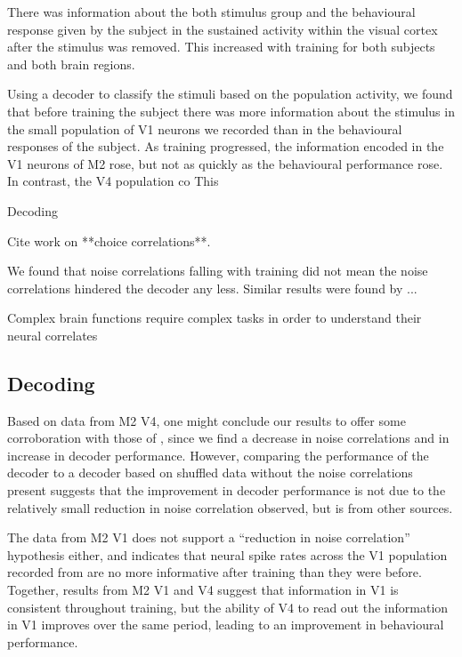There was information about the both stimulus group and the behavioural response given by the subject in the sustained activity within the visual cortex after the stimulus was removed.
This increased with training for both subjects and both brain regions.

Using a decoder to classify the stimuli based on the population activity, we found that before training the subject there was more information about the stimulus in the small population of \ac{V1} neurons we recorded than in the behavioural responses of the subject.
As training progressed, the information encoded in the \ac{V1} neurons of \ac{M2} rose, but not as quickly as the behavioural performance rose.
In contrast, the \ac{V4} population co
This 

Decoding

Cite work on **choice correlations**.

We found that noise correlations falling with training did not mean the noise correlations hindered the decoder any less.
Similar results were found by \citet{Gu2011}...

Complex brain functions require complex tasks in order to understand their neural correlates \citep{Pitkow2017}

\subsection{Decoding}

Based on data from \ac{M2} \ac{V4}, one might conclude our results to offer some corroboration with those of \citet{Gu2011}, since we find a decrease in noise correlations and in increase in decoder performance.
However, comparing the performance of the decoder to a decoder based on shuffled data without the noise correlations present suggests that the improvement in decoder performance is not due to the relatively small reduction in noise correlation observed, but is from other sources.

The data from \ac{M2} \ac{V1} does not support a ``reduction in noise correlation'' hypothesis either, and indicates that neural spike rates across the \ac{V1} population recorded from are no more informative after training than they were before.
Together, results from \ac{M2} \ac{V1} and \ac{V4} suggest that information in \ac{V1} is consistent throughout training, but the ability of \ac{V4} to read out the information in \ac{V1} improves over the same period, leading to an improvement in behavioural performance.

